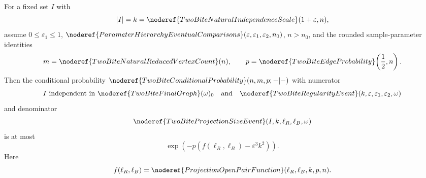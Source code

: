 \begin{lemma}
For a fixed set \(I\) with
\[
|I|=k=\noderef{TwoBiteNaturalIndependenceScale}(1+\varepsilon,n),
\]
assume
\(0\le\varepsilon_1\le1\),
\(\noderef{ParameterHierarchyEventualComparisons}
(\varepsilon,\varepsilon_1,\varepsilon_2,n_0)\), \(n>n_0\), and the rounded
sample-parameter identities
\[
m=\noderef{TwoBiteNaturalReducedVertexCount}(n),
\qquad
p=\noderef{TwoBiteEdgeProbability}\!\left(\frac12,n\right).
\]
Then the conditional probability
\(\noderef{TwoBiteConditionalProbability}(n,m,p;-|-)\) with numerator
\[
I\text{ independent in }\noderef{TwoBiteFinalGraph}(\omega)_0
\quad\text{and}\quad
\noderef{TwoBiteRegularityEvent}(k,\varepsilon,\varepsilon_1,\varepsilon_2,
\omega)
\]
and denominator
\[
\noderef{TwoBiteProjectionSizeEvent}(I,k,\ell_R,\ell_B,\omega)
\]
is at most
\[
\exp\left(-p\left(f(\ell_R,\ell_B)-\varepsilon^3k^2\right)\right).
\]
Here
\[
f(\ell_R,\ell_B)=
\noderef{ProjectionOpenPairFunction}(\ell_R,\ell_B,k,p,n).
\]
\end{lemma}
